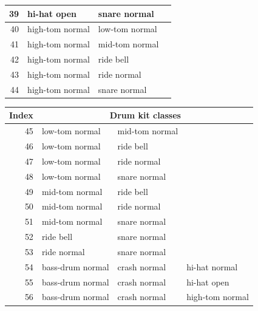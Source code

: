 \begin{appendices}
\begin{figure}[H]
\begin{tiny}
\begin{tabular}{r|l|l|l|}
                    \hline
                    39 & hi-hat open & snare normal & \\
                    \hline
                    40 & high-tom normal & low-tom normal & \\
                    \hline
                    41 & high-tom normal & mid-tom normal & \\
                    \hline
                    42 & high-tom normal & ride bell & \\
                    \hline
                    43 & high-tom normal & ride normal & \\
                    \hline
                    44 & high-tom normal & snare normal & \\
                    \hline
                \end{tabular}
                \qquad
                \begin{tabular}{r|l|l|l|}
                    Index & \multicolumn{3}{c|}{Drum kit classes}\\
                    \hline
                    45 & low-tom normal & mid-tom normal & \\
                    \hline
                    46 & low-tom normal & ride bell & \\
                    \hline
                    47 & low-tom normal & ride normal & \\
                    \hline
                    48 & low-tom normal & snare normal & \\
                    \hline
                    49 & mid-tom normal & ride bell & \\
                    \hline
                    50 & mid-tom normal & ride normal & \\
                    \hline
                    51 & mid-tom normal & snare normal & \\
                    \hline
                    52 & ride bell & snare normal & \\
                    \hline
                    53 & ride normal & snare normal & \\
                    \hline
                    54 & bass-drum normal & crash normal & hi-hat normal \\
                    \hline
                    55 & bass-drum normal & crash normal & hi-hat open \\
                    \hline
                    56 & bass-drum normal & crash normal & high-tom normal \\

\end{tabular}
\end{tiny}
\end{figure}
\end{appendices}
